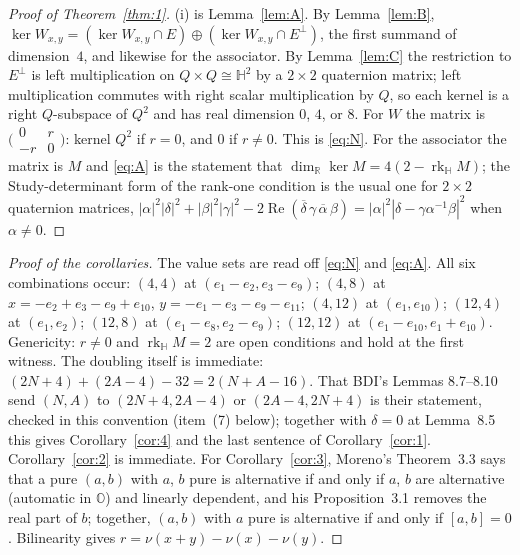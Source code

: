 \documentclass{baustms}
\DeclareMathOperator{\Reop}{Re}
\theoremstyle{cupthm}
\numberwithin{equation}{section}
\newcommand{\HH}{\mathbb{H}}
\newcommand{\OO}{\mathbb{O}}
\newcommand{\RR}{\mathbb{R}}
\newcommand{\rk}{\operatorname{rk}}
\begin{document}
\begin{proof}[Proof of Theorem~\ref{thm:1}]
(i) is Lemma~\ref{lem:A}. By Lemma~\ref{lem:B}, $\ker W_{x,y}=(\ker W_{x,y}\cap E)\oplus(\ker W_{x,y}\cap E^\perp)$, the first summand of dimension~$4$, and likewise for the associator. By Lemma~\ref{lem:C} the restriction to $E^\perp$ is left multiplication on $Q\times Q\cong\HH^2$ by a $2\times 2$ quaternion matrix; left multiplication commutes with right scalar multiplication by $Q$, so each kernel is a right $Q$-subspace of $Q^2$ and has real dimension $0$, $4$, or $8$. For $W$ the matrix is $\bigl(\begin{smallmatrix}0&r\\-r&0\end{smallmatrix}\bigr)$: kernel $Q^2$ if $r=0$, and $0$ if $r\neq 0$. This is \eqref{eq:N}. For the associator the matrix is $M$ and \eqref{eq:A} is the statement that $\dim_{\RR}\ker M=4(2-\rk_{\HH} M)$; the Study-determinant form of the rank-one condition is the usual one for $2\times 2$ quaternion matrices, $|\alpha|^2|\delta|^2+|\beta|^2|\gamma|^2-2\Reop(\overline{\delta}\,\gamma\,\overline{\alpha}\,\beta)=|\alpha|^2|\delta-\gamma\alpha^{-1}\beta|^2$ when $\alpha\neq 0$.
\end{proof}

\begin{proof}[Proof of the corollaries]
The value sets are read off \eqref{eq:N} and \eqref{eq:A}. All six combinations occur: $(4,4)$ at $(e_1-e_2,e_3-e_9)$; $(4,8)$ at $x=-e_2+e_3-e_9+e_{10}$, $y=-e_1-e_3-e_9-e_{11}$; $(4,12)$ at $(e_1,e_{10})$; $(12,4)$ at $(e_1,e_2)$; $(12,8)$ at $(e_1-e_8,e_2-e_9)$; $(12,12)$ at $(e_1-e_{10},e_1+e_{10})$. Genericity: $r\neq 0$ and $\rk_{\HH} M=2$ are open conditions and hold at the first witness. The doubling itself is immediate: $(2N+4)+(2A-4)-32=2(N+A-16)$. That BDI's Lemmas 8.7--8.10 send $(N,A)$ to $(2N+4,2A-4)$ or $(2A-4,2N+4)$ is their statement, checked in this convention (item~(7) below); together with $\delta=0$ at Lemma~8.5 this gives Corollary~\ref{cor:4} and the last sentence of Corollary~\ref{cor:1}. Corollary~\ref{cor:2} is immediate. For Corollary~\ref{cor:3}, Moreno's Theorem~3.3 says that a pure $(a,b)$ with $a$, $b$ pure is alternative if and only if $a$, $b$ are alternative (automatic in $\OO$) and linearly dependent, and his Proposition~3.1 removes the real part of $b$; together, $(a,b)$ with $a$ pure is alternative if and only if $[a,b]=0$. Bilinearity gives $r=\nu(x+y)-\nu(x)-\nu(y)$.
\end{proof}
\end{document}
